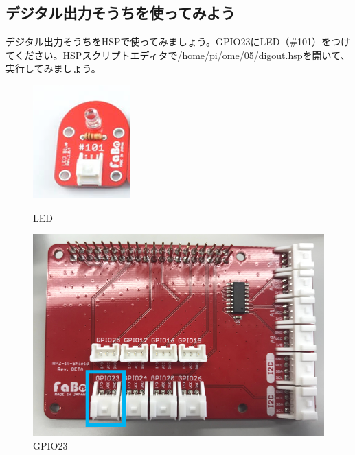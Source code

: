 \subsection{デジタル出力そうちを使ってみよう}
デジタル出力そうちをHSPで使ってみましょう。GPIO23にLED（\#101）をつけてください。HSPスクリプトエディタで/home/pi/ome/05/digout.hspを開いて、実行してみましょう。\\
\begin{figure}[H]
  \begin{minipage}[t]{0.3\columnwidth}
    \centering
 \includegraphics[width=\linewidth]{images/chap05/text05-img026.png}
    \caption{LED}
  \end{minipage}
  \begin{minipage}[t]{0.5\columnwidth}
    \centering
    \includegraphics[width=\linewidth]{images/chap05/text05-img027.png}
    \caption{GPIO23}
  \end{minipage}
\end{figure}

